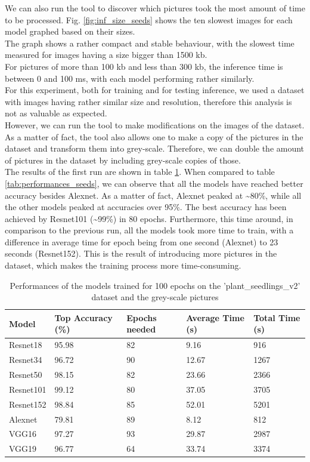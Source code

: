 We can also run the tool to discover which pictures took the most amount of time to be processed. Fig. \ref{fig:inf_size_seeds} shows the ten slowest images for each model graphed based on their sizes. \\
The graph shows a rather compact and stable behaviour, with the slowest time measured for images having a size bigger than 1500 kb. \\
For pictures of more than 100 kb and less than 300 kb, the inference time is between 0 and 100 ms, with each model performing rather similarly. \\
For this experiment, both for training and for testing inference, we used a dataset with images having rather similar size and resolution, therefore this analysis is not as valuable as expected.\\
However, we can run the tool to make modifications on the images of the dataset. As a matter of fact, the tool also allows one to make a copy of the pictures in the dataset and transform them into grey-scale. Therefore, we can double the amount of pictures in the dataset by including grey-scale copies of those. \\
The results of the first run are shown in table \ref{tab:performances_seeds_gray}. When compared to 
table \ref{tab:performances_seeds}, we can observe that all the models have reached better accuracy besides Alexnet. As a matter of fact, Alexnet peaked at \textasciitilde80\%, while all the other models peaked at accuracies over 95\%. The best accuracy has been achieved by Resnet101 (\textasciitilde99\%) in 80 epochs. Furthermore, this time around, in comparison to the previous run, all the models took more time to train, with a difference in average time for epoch being from one second (Alexnet) to 23 seconds (Resnet152). This is the result of introducing more pictures in the dataset, which makes the training process more time-consuming. \\
\begin{table}[htbp]
\centering
\begin{tabular}{ p{2cm} p{4cm} p{3cm} p{3cm} p{2cm}  }
 Model& Top Accuracy (\%) & Epochs needed &Average Time (s)&Total Time (s)\\
 \hline
Resnet18&95.98&82&9.16&916\\
Resnet34&96.72&90&12.67&1267\\
Resnet50&98.15&82&23.66&2366\\
Resnet101&99.12&80&37.05&3705\\
Resnet152&98.84&85&52.01&5201\\
Alexnet&79.81&89&8.12&812\\
VGG16&97.27&93&29.87&2987\\
VGG19&96.77&64&33.74&3374\\
 \hline
\end{tabular}
\caption{Performances of the models trained for 100 epochs on the 'plant\_seedlings\_v2' dataset and the grey-scale pictures}
\label{tab:performances_seeds_gray}
\end{table}

